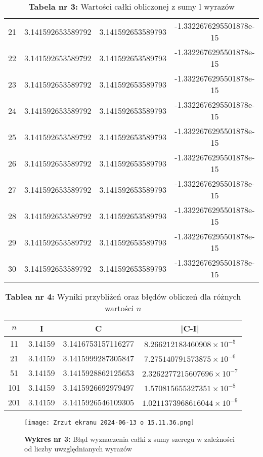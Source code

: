 \documentclass{article}
\begin{document}
\begin{table}[h!]
\begin{tabular}{cccc}
21 & 3.141592653589792 & 3.141592653589793 & -1.3322676295501878e-15 \\
22 & 3.141592653589792 & 3.141592653589793 & -1.3322676295501878e-15 \\
23 & 3.141592653589792 & 3.141592653589793 & -1.3322676295501878e-15 \\
24 & 3.141592653589792 & 3.141592653589793 & -1.3322676295501878e-15 \\
25 & 3.141592653589792 & 3.141592653589793 & -1.3322676295501878e-15 \\
26 & 3.141592653589792 & 3.141592653589793 & -1.3322676295501878e-15 \\
27 & 3.141592653589792 & 3.141592653589793 & -1.3322676295501878e-15 \\
28 & 3.141592653589792 & 3.141592653589793 & -1.3322676295501878e-15 \\
29 & 3.141592653589792 & 3.141592653589793 & -1.3322676295501878e-15 \\
30 & 3.141592653589792 & 3.141592653589793 & -1.3322676295501878e-15 \\
\bottomrule
\end{tabular}
\caption*{\textbf{Tabela nr 3:} Wartości całki obliczonej z sumy l wyrazów}
\end{table}

\begin{table}[h!]
\centering
\begin{tabular}{cccc}
\toprule
\(n\) & I & C & |C-I| \\
\midrule
11 & 3.14159 & 3.1416753157116277 & \(8.266212183460908 \times 10^{-5}\) \\
21 & 3.14159 & 3.1415999287305847 & \(7.275140791573875 \times 10^{-6}\) \\
51 & 3.14159 & 3.1415928862125653 & \(2.3262277215607696 \times 10^{-7}\) \\
101 & 3.14159 & 3.1415926692979497 & \(1.570815655327351 \times 10^{-8}\) \\
201 & 3.14159 & 3.1415926546109305 & \(1.0211373968616044 \times 10^{-9}\) \\
\bottomrule
\end{tabular}
\caption*{\textbf{Tablea nr 4:} Wyniki przybliżeń oraz błędów obliczeń dla różnych wartości \(n\)}
\end{table}

\begin{figure}[h]
    \centering
    \texttt{[image: Zrzut ekranu 2024-06-13 o 15.11.36.png]}
    \caption{\textbf{Wykres nr 3:} Błąd wyznaczenia całki z sumy szeregu w zależności od liczby uwzględnianych wyrazów}
    \label{fig:enter-label}
\end{figure}
\end{document}
